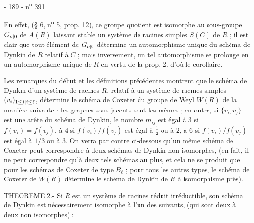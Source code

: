 - 189 - \hfill n\textsuperscript{o} 391

En effet, (§ 6, n\textsuperscript{o} 5, prop. 12), ce groupe quotient est isomorphe au sous-groupe $G_{\relax{o|0}}$ de $A(R)$ laissant stable un système de racines simples $S(C)$ de $R$ ; il est clair que tout élément de $G_{\relax{o|0}}$ détermine un automorphisme unique du schéma de Dynkin de $R$ relatif à $C$ ; mais inversement, un tel automorphisme se prolonge en un automorphisme unique de $R$ en vertu de la prop. 2, d'où le corollaire.

Les remarques du début et les définitions précédentes montrent que le schéma de Dynkin d'un système de racines $R$, relatif à un système de racines simples $(v_i)_{1\leq\relax{j|i}\leq\ell}$, détermine le schéma de Coxeter du groupe de Weyl $W(R)$ de la manière suivante : les graphes sous-jacents sont les mêmes ; en outre, si $\{v_i,v_j\}$ est une arête du schéma de Dynkin, le nombre $m_{ij}$ est égal à $3$ si $f(v_i)=f(v_j)$, à $4$ si $f(v_i)/f(v_j)$ est égal à $\frac12$ ou à $2$, à $6$ si $f(v_i)/f(v_j)$ est égal à $1/3$ ou à $3$. On verra par contre ci-dessous qu'un même schéma de Coxeter peut correspondre à deux schémas de Dynkin non isomorphes, (en fait, il ne peut correspondre qu'à \uline{deux} tels schémas au plus, et cela ne se produit que pour les schémas de Coxeter de type $B_\ell$ ; pour tous les autres types, le schéma de Coxeter de $W(R)$ détermine le schéma de Dynkin de $R$ à isomorphisme près).

THEOREME 2.- \uline{Si} $R$ \uline{est un système de racines réduit irréductible}, \uline{son schéma de Dynkin est nécessairement isomorphe à l'un des suivants}, (\uline{qui sont deux à deux non isomorphes}) :

